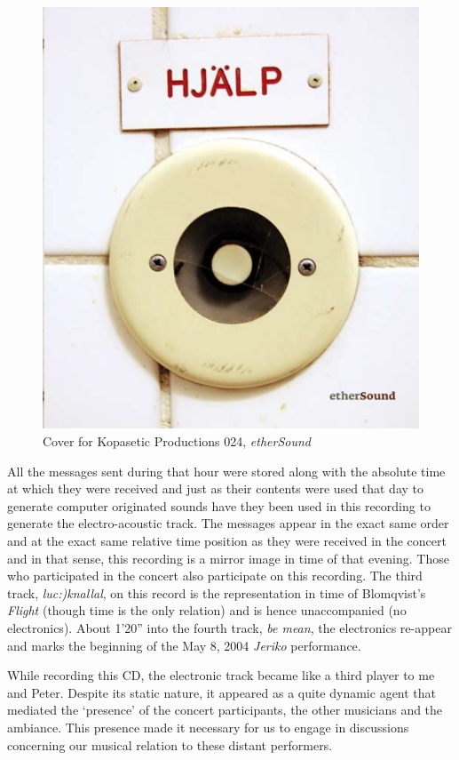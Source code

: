 \begin{figure}
  \centering
  \includegraphics[width=\linewidth]{img/ethers-cover}
  \caption{Cover for Kopasetic Productions 024, \emph{etherSound}}
  \label{fig:ether-cover}
\end{figure}
All the messages sent during that hour were stored along with the
absolute time at which they were received and just as their contents were
used that day to generate computer originated sounds have they been
used in this recording to generate the electro-acoustic track. The
messages appear in the exact same order and at the exact same relative
time position as they were received in the concert and in that sense, this
recording is a mirror image in time of that evening. Those who
participated in the concert also participate on this
recording. The third track, \emph{luc:)knallal}, on this record is the
representation in time of Blomqvist's \emph{Flight}
(though time is the only relation) and is hence unaccompanied (no
electronics). About 1'20'' into the fourth track, \emph{be mean}, the
electronics re-appear and marks the beginning of the May 8, 2004 
\emph{Jeriko} performance.

While recording this CD, the electronic track became like a third
player to me and Peter. Despite its static nature, it appeared as a
quite dynamic agent that mediated the `presence' of the concert
participants, the other musicians and the ambiance. This presence
made it necessary for us to engage in discussions concerning our
musical relation to these distant performers.

